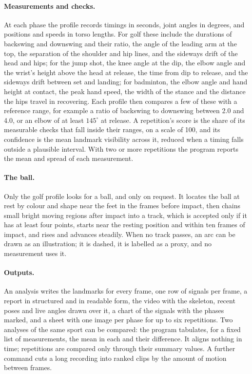 \documentclass[sigconf,nonacm]{acmart}
\begin{document}
\paragraph{Measurements and checks.}
At each phase the profile records timings in seconds, joint angles in degrees, and positions
and speeds in torso lengths. For golf these include the durations of backswing and downswing
and their ratio, the angle of the leading arm at the top, the separation of the shoulder and
hip lines, and the sideways drift of the head and hips; for the jump shot, the knee angle at
the dip, the elbow angle and the wrist's height above the head at release, the time from dip
to release, and the sideways drift between set and landing; for badminton, the elbow angle and
hand height at contact, the peak hand speed, the width of the stance and the distance the hips
travel in recovering. Each profile then compares a few of these with a reference range, for
example a ratio of backswing to downswing between 2.0 and 4.0, or an elbow of at least
$145^\circ$ at release. A repetition's score is the share of its measurable checks that fall
inside their ranges, on a scale of 100, and its confidence is the mean landmark visibility
across it, reduced when a timing falls outside a plausible interval. With two or more
repetitions the program reports the mean and spread of each measurement.

\paragraph{The ball.}
Only the golf profile looks for a ball, and only on request. It locates the ball at rest by
colour and shape near the feet in the frames before impact, then chains small bright moving
regions after impact into a track, which is accepted only if it has at least four points,
starts near the resting position and within ten frames of impact, and rises and advances
steadily. When no track passes, an arc can be drawn as an illustration; it is dashed, it is
labelled as a proxy, and no measurement uses it.

\paragraph{Outputs.}
An analysis writes the landmarks for every frame, one row of signals per frame, a report in
structured and in readable form, the video with the skeleton, recent poses and live angles
drawn over it, a chart of the signals with the phases marked, and a sheet with one image per
phase for up to six repetitions. Two analyses of the same sport can be compared: the program
tabulates, for a fixed list of measurements, the mean in each and their difference. It aligns
nothing in time; repetitions are compared only through their summary values. A further command
cuts a long recording into ranked clips by the amount of motion between frames.
\end{document}
